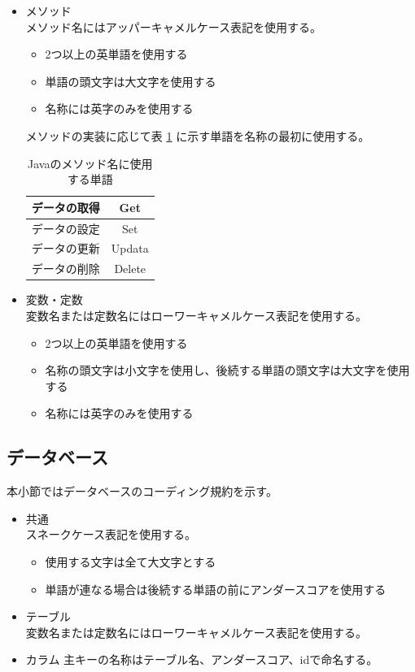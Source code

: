 \documentclass[a4j]{jarticle}
\begin{document}
\begin{itemize}
	\item メソッド\\
		メソッド名にはアッパーキャメルケース表記を使用する。
	\begin{itemize}
		\item 2つ以上の英単語を使用する
		\item 単語の頭文字は大文字を使用する
		\item 名称には英字のみを使用する
	\end{itemize}
		メソッドの実装に応じて表 \ref {tab:o3} に示す単語を名称の最初に使用する。
				\begin{table}[H]
			\caption{Javaのメソッド名に使用する単語}
			\label{tab:o3}
			\begin{center}
			\begin{tabular}{|c|c|}
			\hline
			データの取得 & Get\\\hline
			データの設定 & Set\\\hline
			データの更新  & Updata\\\hline
			データの削除  & Delete\\\hline
			\end{tabular}
			\end{center}
			\end{table}
	\item 変数・定数\\
		変数名または定数名にはローワーキャメルケース表記を使用する。
	\begin{itemize}
		\item 2つ以上の英単語を使用する
		\item 名称の頭文字は小文字を使用し、後続する単語の頭文字は大文字を使用する
		\item 名称には英字のみを使用する
	\end{itemize}
\end{itemize}
\subsection{データベース}
本小節ではデータベースのコーディング規約を示す。
	\begin{itemize}
	\item 共通\\
		スネークケース表記を使用する。
	\begin{itemize}
		\item 使用する文字は全て大文字とする
		\item 単語が連なる場合は後続する単語の前にアンダースコアを使用する
	\end{itemize}
	\item テーブル\\
		変数名または定数名にはローワーキャメルケース表記を使用する。
	\item カラム
		主キーの名称はテーブル名、アンダースコア、idで命名する。
\end{itemize}
\end{document}
